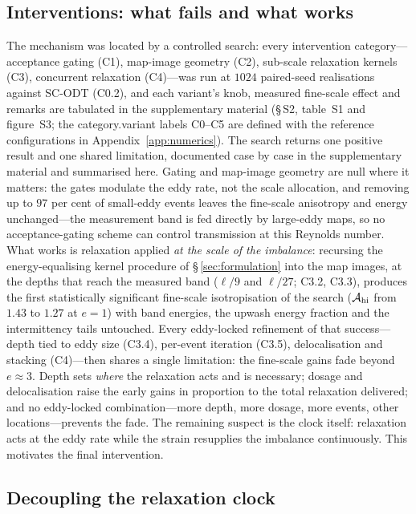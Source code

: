 \documentclass[lineno]{JFM-FLM_Au}
\begin{document}
\subsection{Interventions: what fails and what works}\label{sec:interventions}

The mechanism was located by a controlled search: every intervention
category---acceptance gating (C1), map-image geometry (C2), sub-scale
relaxation kernels (C3), concurrent relaxation (C4)---was run at $1024$
paired-seed realisations against SC-ODT (C0.2), and each
variant's knob, measured fine-scale effect and remarks are tabulated in
the supplementary material (\S\,S2, table~S1 and figure~S3; the
category.variant labels C0--C5 are defined with the reference
configurations in Appendix~\ref{app:numerics}). The search returns one
positive result and one shared limitation, documented case by case in
the supplementary material and summarised here. Gating and map-image
geometry are null where it matters: the gates modulate the eddy rate,
not the scale allocation, and removing up to $97$ per cent of
small-eddy events leaves the fine-scale anisotropy and energy
unchanged---the measurement band is fed directly by large-eddy
maps, so no acceptance-gating scheme can control transmission at this
Reynolds number. What works is relaxation applied \emph{at the scale
of the imbalance}: recursing the energy-equalising kernel procedure of
\S\,\ref{sec:formulation} into the map images, at the depths that
reach the measured band ($\ell/9$ and $\ell/27$; C3.2, C3.3), produces
the first statistically significant fine-scale isotropisation of the
search ($\mathcal A_{\rm hi}$ from $1.43$ to $1.27$ at $e=1$) with
band energies, the upwash energy fraction and the intermittency tails
untouched. Every eddy-locked refinement of that success---depth tied
to eddy size (C3.4), per-event iteration (C3.5), delocalisation and
stacking (C4)---then shares a single limitation: the fine-scale gains
fade beyond $e\approx3$. Depth sets \emph{where} the relaxation acts
and is necessary; dosage and delocalisation raise the early gains in
proportion to the total relaxation delivered; and no eddy-locked
combination---more depth, more dosage, more events, other
locations---prevents the fade. The remaining suspect is the clock
itself: relaxation acts at the eddy rate while the strain resupplies
the imbalance continuously. This motivates the final intervention.

\subsection{Decoupling the relaxation clock}\label{sec:clock}
\end{document}
